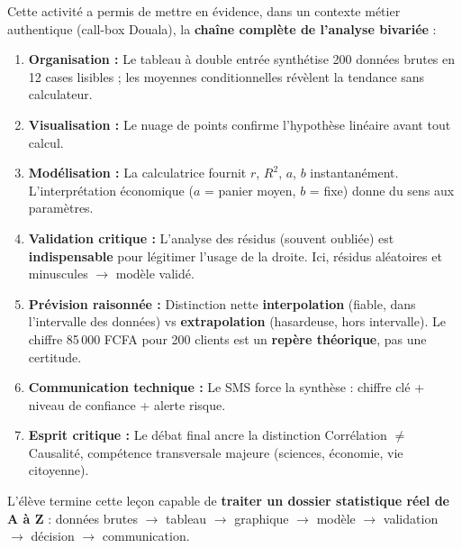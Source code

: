 \documentclass[11pt]{article}
\newcommand{\cle}[1]{{\popxbold\color{popdark}#1}}
\newcounter{popsec}
\newcounter{popsub}
\newcommand{\courssub}[1]{%
  \stepcounter{popsub}%
  \par\vspace{9pt}\noindent{\popxbold\fontsize{11.5}{13}\selectfont\color{popink}{\color{poporange}\thepopsec.\thepopsub}\hspace{6pt}#1}\par\nopagebreak\vspace{4pt}
}
\begin{document}
\courssub{Bilan de l'activité}
Cette activité a permis de mettre en évidence, dans un contexte métier authentique (call-box Douala), la \textbf{chaîne complète de l'analyse bivariée} :
\begin{enumerate}
    \item \textbf{Organisation :} Le tableau à double entrée synthétise 200 données brutes en 12 cases lisibles ; les moyennes conditionnelles révèlent la tendance sans calculateur.
    \item \textbf{Visualisation :} Le nuage de points confirme l'hypothèse linéaire avant tout calcul.
    \item \textbf{Modélisation :} La calculatrice fournit $r$, $R^2$, $a$, $b$ instantanément. L'interprétation économique ($a$ = panier moyen, $b$ = fixe) donne du sens aux paramètres.
    \item \textbf{Validation critique :} L'analyse des résidus (souvent oubliée) est \textbf{indispensable} pour légitimer l'usage de la droite. Ici, résidus aléatoires et minuscules $\to$ modèle validé.
    \item \textbf{Prévision raisonnée :} Distinction nette \textbf{interpolation} (fiable, dans l'intervalle des données) vs \textbf{extrapolation} (hasardeuse, hors intervalle). Le chiffre 85\,000 FCFA pour 200 clients est un \textbf{repère théorique}, pas une certitude.
    \item \textbf{Communication technique :} Le SMS force la synthèse : chiffre clé + niveau de confiance + alerte risque.
    \item \textbf{Esprit critique :} Le débat final ancre la distinction \cle{Corrélation $\neq$ Causalité}, compétence transversale majeure (sciences, économie, vie citoyenne).
\end{enumerate}
L'élève termine cette leçon capable de \textbf{traiter un dossier statistique réel de A à Z} : données brutes $\to$ tableau $\to$ graphique $\to$ modèle $\to$ validation $\to$ décision $\to$ communication.
\end{document}
